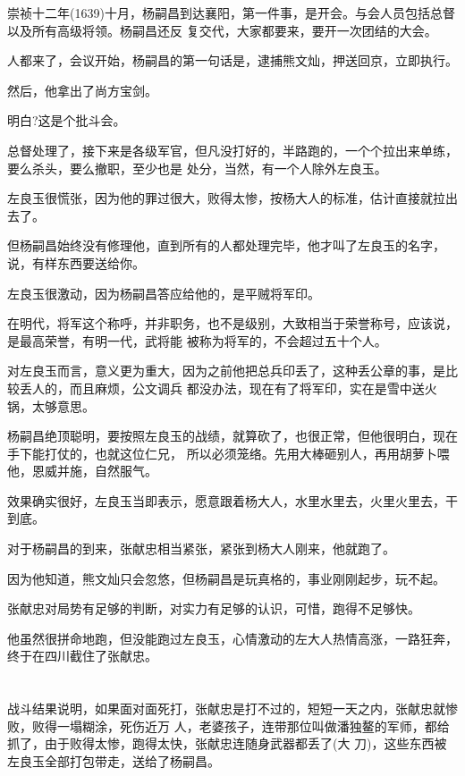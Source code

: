 \documentclass[11pt,a4paper,onecolumn]{article}
\begin{document}
崇祯十二年(1639)十月，杨嗣昌到达襄阳，第一件事，是开会。与会人员包括总督以及所有高级将领。杨嗣昌还反
复交代，大家都要来，要开一次团结的大会。

人都来了，会议开始，杨嗣昌的第一句话是，逮捕熊文灿，押送回京，立即执行。

然后，他拿出了尚方宝剑。

明白?这是个批斗会。

总督处理了，接下来是各级军官，但凡没打好的，半路跑的，一个个拉出来单练，要么杀头，要么撤职，至少也是
处分，当然，有一个人除外\myrule 左良玉。

左良玉很慌张，因为他的罪过很大，败得太惨，按杨大人的标准，估计直接就拉出去了。

但杨嗣昌始终没有修理他，直到所有的人都处理完毕，他才叫了左良玉的名字，说，有样东西要送给你。

左良玉很激动，因为杨嗣昌答应给他的，是平贼将军印。

在明代，将军这个称呼，并非职务，也不是级别，大致相当于荣誉称号，应该说，是最高荣誉，有明一代，武将能
被称为将军的，不会超过五十个人。

对左良玉而言，意义更为重大，因为之前他把总兵印丢了，这种丢公章的事，是比较丢人的，而且麻烦，公文调兵
都没办法，现在有了将军印，实在是雪中送火锅，太够意思。

杨嗣昌绝顶聪明，要按照左良玉的战绩，就算砍了，也很正常，但他很明白，现在手下能打仗的，也就这位仁兄，
所以必须笼络。先用大棒砸别人，再用胡萝卜喂他，恩威并施，自然服气。

效果确实很好，左良玉当即表示，愿意跟着杨大人，水里水里去，火里火里去，干到底。

对于杨嗣昌的到来，张献忠相当紧张，紧张到杨大人刚来，他就跑了。

因为他知道，熊文灿只会忽悠，但杨嗣昌是玩真格的，事业刚刚起步，玩不起。

张献忠对局势有足够的判断，对实力有足够的认识，可惜，跑得不足够快。

他虽然很拼命地跑，但没能跑过左良玉，心情激动的左大人热情高涨，一路狂奔，终于在四川截住了张献忠。

\section[\thesection]{}

战斗结果说明，如果面对面死打，张献忠是打不过的，短短一天之内，张献忠就惨败，败得一塌糊涂，死伤近万
人，老婆孩子，连带那位叫做潘独鳌的军师，都给抓了，由于败得太惨，跑得太快，张献忠连随身武器都丢了(大
刀)，这些东西被左良玉全部打包带走，送给了杨嗣昌。
\end{document}
